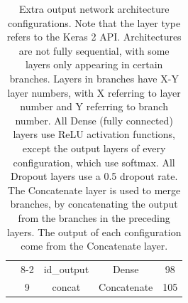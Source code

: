 \begin{table}[h!]
\begin{center}
\begin{tabular}{|c|c|c|c|c|}
& 8-2 & id\_output & Dense & 98 \\ \cline{2-5}
& 9 & concat & Concatenate & 105 \\ \hline
\end{tabular}
\end{center}
\caption[Extra output architecture configurations]{Extra output network architecture configurations. Note that the layer type refers to the Keras 2 API. Architectures are not fully sequential, with some layers only appearing in certain branches. Layers in branches have X-Y layer numbers, with X referring to layer number and Y referring to branch number. All Dense (fully connected) layers use ReLU activation functions, except the output layers of every configuration, which use softmax. All Dropout layers use a 0.5 dropout rate. The Concatenate layer is used to merge branches, by concatenating the output from the branches in the preceding layers. The output of each configuration come from the Concatenate layer.}
\label{tab:ex-out-arch}
\end{table}


\cleardoublepage